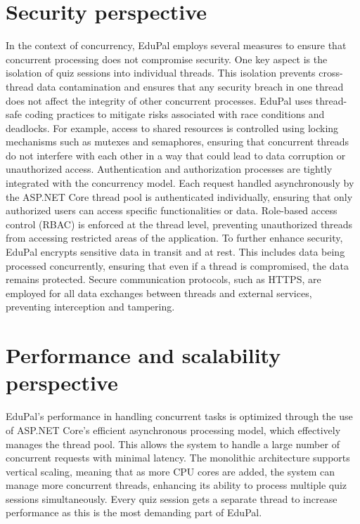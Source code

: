 \section{Security perspective}

In the context of concurrency, EduPal employs several measures to ensure that concurrent processing does not compromise security. One key aspect is the isolation of quiz sessions into individual threads. This isolation prevents cross-thread data contamination and ensures that any security breach in one thread does not affect the integrity of other concurrent processes.
EduPal uses thread-safe coding practices to mitigate risks associated with race conditions and deadlocks. For example, access to shared resources is controlled using locking mechanisms such as mutexes and semaphores, ensuring that concurrent threads do not interfere with each other in a way that could lead to data corruption or unauthorized access.
Authentication and authorization processes are tightly integrated with the concurrency model. Each request handled asynchronously by the ASP.NET Core thread pool is authenticated individually, ensuring that only authorized users can access specific functionalities or data. Role-based access control (RBAC) is enforced at the thread level, preventing unauthorized threads from accessing restricted areas of the application.
To further enhance security, EduPal encrypts sensitive data in transit and at rest. This includes data being processed concurrently, ensuring that even if a thread is compromised, the data remains protected. Secure communication protocols, such as HTTPS, are employed for all data exchanges between threads and external services, preventing interception and tampering.

\section{Performance and scalability perspective}

EduPal's performance in handling concurrent tasks is optimized through the use of ASP.NET Core's efficient asynchronous processing model, which effectively manages the thread pool. This allows the system to handle a large number of concurrent requests with minimal latency. The monolithic architecture supports vertical scaling, meaning that as more CPU cores are added, the system can manage more concurrent threads, enhancing its ability to process multiple quiz sessions simultaneously. Every quiz session gets a separate thread to increase performance as this is the most demanding part of EduPal.

